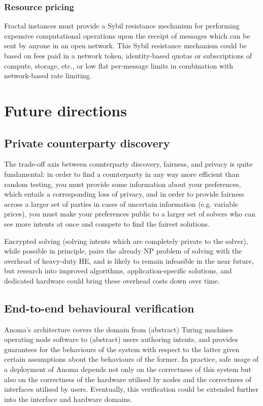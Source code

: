 \documentclass[
    9pt,            %
    commun,        %
    affiltop,       %
]{art}
\begin{document}
\subsubsection{Resource pricing}\label{resource-pricing}

Fractal instances must provide a Sybil resistance mechanism for
performing expensive computational operations upon the receipt of
messages which can be sent by anyone in an open network. This Sybil
resistance mechanism could be based on fees paid in a network token,
identity-based quotas or subscriptions of compute, storage, etc., or low
flat per-message limits in combination with network-based rate limiting.

\section{Future directions}\label{future-directions}

\subsection{Private counterparty
discovery}\label{private-counterparty-discovery}

The trade-off axis between counterparty discovery, fairness, and privacy
is quite fundamental: in order to find a counterparty in any way more
efficient than random testing, you must provide some information about
your preferences, which entails a corresponding loss of privacy, and in
order to provide fairness across a larger set of parties in cases of
uncertain information (e.g. variable prices), you must make your
preferences public to a larger set of solvers who can see more intents
at once and compete to find the fairest solutions.

Encrypted solving (solving intents which are completely private to the
solver), while possible in principle, pairs the already NP problem of
solving with the overhead of heavy-duty HE, and is likely to remain
infeasible in the near future, but research into improved algorithms,
application-specific solutions, and dedicated hardware could bring these
overhead costs down over time.

\subsection{End-to-end behavioural
verification}\label{end-to-end-behavioural-verification}

Anoma's architecture covers the domain from (abstract)
Turing machines operating node software to (abstract) users authoring
intents, and provides guarantees for the behaviours of the system with
respect to the latter given certain assumptions about the behaviours of
the former. In practice, safe usage of a deployment of Anoma depends not
only on the correctness of this system but also on the correctness of
the hardware utilised by nodes and the correctness of interfaces
utilised by users. Eventually, this verification could be extended
further into the interface and hardware domains.
\end{document}
